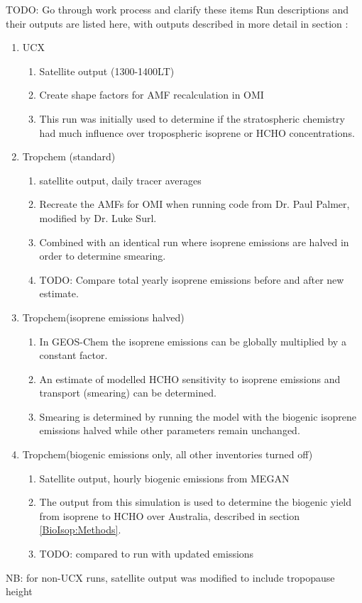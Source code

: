     TODO: Go through work process and clarify these items
    Run descriptions and their outputs are listed here, with outputs described in more detail in section :
    \begin{enumerate}
      \item UCX 
      \begin{enumerate}
        \item Satellite output (1300-1400LT)
        \item Create shape factors for AMF recalculation in OMI
        \item This run was initially used to determine if the stratospheric chemistry had much influence over tropospheric isoprene or HCHO concentrations.
      \end{enumerate}
      
      \item Tropchem (standard)
      \begin{enumerate}
        \item satellite output, daily tracer averages
        \item Recreate the AMFs for OMI when running code from Dr. Paul Palmer, modified by Dr. Luke Surl.
        \item Combined with an identical run where isoprene emissions are halved in order to determine smearing.
        \item TODO: Compare total yearly isoprene emissions before and after new estimate.
      \end{enumerate}
      
      \item Tropchem(isoprene emissions halved)
      \begin{enumerate}
        \item In GEOS-Chem the isoprene emissions can be globally multiplied by a constant factor.
        \item An estimate of modelled HCHO sensitivity to isoprene emissions and transport (smearing) can be determined.
        \item Smearing is determined by running the model with the biogenic isoprene emissions halved while other parameters remain unchanged.
      \end{enumerate}
      
      \item Tropchem(biogenic emissions only, all other inventories turned off)
      \begin{enumerate}
        \item Satellite output, hourly biogenic emissions from MEGAN
        \item The output from this simulation is used to determine the biogenic yield from isoprene to HCHO over Australia, described in section \ref{BioIsop:Methods}.
        \item TODO: compared to run with updated emissions
      \end{enumerate}
      
    \end{enumerate}
    NB: for non-UCX runs, satellite output was modified to include tropopause height

